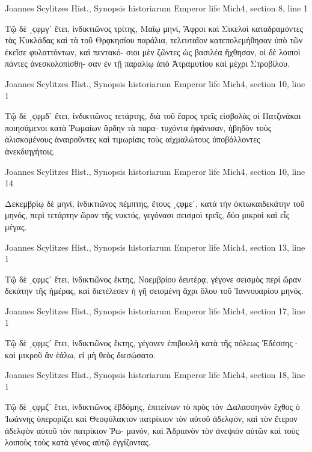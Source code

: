 \documentclass[12pt,letterpaper,twoside,final]{memoir}
\begin{document}
\begin{greek}
Joannes Scylitzes Hist., Synopsis historiarum 
Emperor life Mich4, section 8, line 1

Τῷ δὲ ͵ϛφμγʹ ἔτει, ἰνδικτιῶνος τρίτης, Μαΐῳ μηνί, Ἄφροι καὶ 
Σικελοὶ καταδραμόντες τὰς Κυκλάδας καὶ τὰ τοῦ Θρᾳκησίου παράλια, 
τελευταῖον κατεπολεμήθησαν ὑπὸ τῶν ἐκεῖσε φυλαττόντων, καὶ πεντακό-
σιοι μὲν ζῶντες ὡς βασιλέα ἤχθησαν, οἱ δὲ λοιποὶ πάντες ἀνεσκολοπίσθη-
σαν ἐν τῇ παραλίῳ ἀπὸ Ἀτραμυτίου καὶ μέχρι Στροβίλου. 



Joannes Scylitzes Hist., Synopsis historiarum 
Emperor life Mich4, section 10, line 1

Τῷ δὲ ͵ϛφμδʹ ἔτει, ἰνδικτιῶνος τετάρτης, διὰ τοῦ ἔαρος τρεῖς 
εἰσβολὰς οἱ Πατζινάκαι ποιησάμενοι κατὰ Ῥωμαίων ἄρδην τὰ παρα-
τυχόντα ἠφάνισαν, ἡβηδὸν τοὺς ἁλισκομένους ἀναιροῦντες καὶ τιμωρίαις 
τοὺς αἰχμαλώτους ὑποβάλλοντες ἀνεκδιηγήτοις. 



Joannes Scylitzes Hist., Synopsis historiarum 
Emperor life Mich4, section 10, line 14

                                                                Δεκεμβρίῳ δὲ 
μηνί, ἰνδικτιῶνος πέμπτης, ἔτους ͵ϛφμεʹ, κατὰ τὴν ὀκτωκαιδεκάτην τοῦ 
μηνός, περὶ τετάρτην ὥραν τῆς νυκτός, γεγόνασι σεισμοὶ τρεῖς, δύο μικροὶ 
καὶ εἷς μέγας. 



Joannes Scylitzes Hist., Synopsis historiarum 
Emperor life Mich4, section 13, line 1

Τῷ δὲ ͵ϛφμϛʹ ἔτει, ἰνδικτιῶνος ἕκτης, Νοεμβρίου δευτέρᾳ, γέγονε 
σεισμὸς περὶ ὥραν δεκάτην τῆς ἡμέρας, καὶ διετέλεσεν ἡ γῆ σειομένη 
ἄχρι ὅλου τοῦ Ἰαννουαρίου μηνός. 



Joannes Scylitzes Hist., Synopsis historiarum 
Emperor life Mich4, section 17, line 1

Τῷ δὲ ͵ϛφμϛʹ ἔτει, ἰνδικτιῶνος ἕκτης, γέγονεν ἐπιβουλὴ κατὰ τῆς 
πόλεως Ἐδέσσης· καὶ μικροῦ ἂν ἑάλω, εἰ μὴ θεὸς διεσώσατο. 



Joannes Scylitzes Hist., Synopsis historiarum 
Emperor life Mich4, section 18, line 1

Τῷ δὲ ͵ϛφμζʹ ἔτει, ἰνδικτιῶνος ἑβδόμης, ἐπιτείνων τὸ πρὸς τὸν 
Δαλασσηνὸν ἔχθος ὁ Ἰωάννης ὑπερορίζει καὶ Θεοφύλακτον πατρίκιον 
τὸν αὐτοῦ ἀδελφόν, καὶ τὸν ἕτερον ἀδελφὸν αὐτοῦ τὸν πατρίκιον Ῥω-
μανόν, καὶ Ἀδριανὸν τὸν ἀνεψιὸν αὐτῶν καὶ τοὺς λοιποὺς τοὺς κατὰ 
γένος αὐτῷ ἐγγίζοντας. 




\end{greek}
\end{document}
